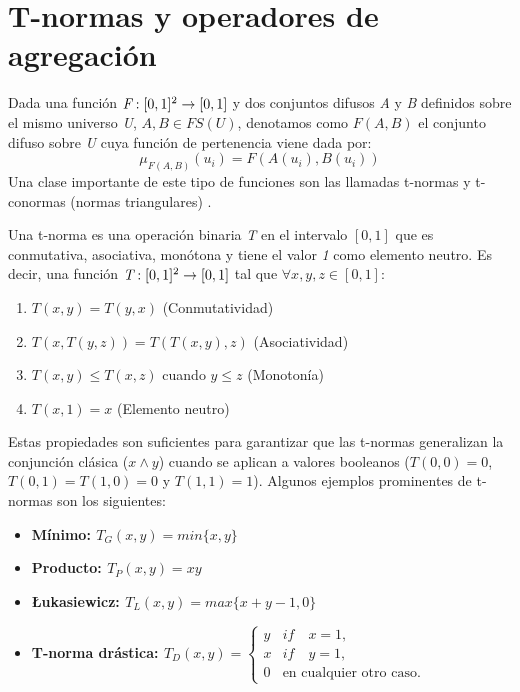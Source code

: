 \section{T-normas y operadores de agregación}\label{sec:t-norms-aggregation-operator}
Dada una función \begin{math}\emph{F}:[0,1]^2\rightarrow[0,1]\end{math} y dos conjuntos difusos \emph{A} y \emph{B} definidos sobre el mismo universo \emph{U}, \begin{math}A,B\in FS(U)\end{math}, denotamos como \begin{math}F(A,B)\end{math} el conjunto difuso sobre \emph{U} cuya función de pertenencia viene dada por:
\begin{equation}
\mu_{F(A,B)}(u_{i}) = F(A(u_{i}),B(u_{i}))
\end{equation}
Una clase importante de este tipo de funciones son las llamadas t-normas y t-conormas (normas triangulares) \cite{klement2000triangular}.
\begin{definition}\label{def:tnorma}
Una t-norma es una operación binaria \emph{T} en el intervalo $[0,1]$ que es conmutativa, asociativa, monótona y tiene el valor \emph{1} como elemento neutro. Es decir, una función $\emph{T} : [0,1]^2 \rightarrow [0,1]$ tal que $\forall x,y,z \in [0,1]$:
\begin{enumerate}[label=(T\arabic*),ref=(T\arabic*)]
   \item $T(x,y) = T(y,x)$ (Conmutatividad)\label{T1}
   \item $T(x,T(y,z)) = T(T(x,y),z)$ (Asociatividad)\label{T2}
   \item $T(x,y) \leq T(x,z)$ cuando $y \leq z$ (Monotonía)\label{T3}
   \item $T(x,1) = x$ (Elemento neutro)\label{T4}
  \end{enumerate}
\end{definition}
Estas propiedades son suficientes para garantizar que las t-normas generalizan la conjunción clásica ($x\wedge y$) cuando se aplican a valores booleanos ($T(0,0)=0$,$T(0,1)=T(1,0)=0$ y $T(1,1)=1$).
Algunos ejemplos prominentes de t-normas son los siguientes:
\begin{itemize}
	\item \bfseries Mínimo: $T_{G}(x,y) = min\{x,y\}$
	\item \bfseries Producto: $T_{P}(x,y) = xy$
	\item \bfseries \L{}ukasiewicz: $T_{L}(x,y) = max\{x+y-1,0\}$
	\item \bfseries T-norma drástica: \mdseries $T_{D}(x,y) = \begin{cases} y & if\quad x=1, \\ x & if\quad y=1, \\0 & \text{en cualquier otro caso}. \end{cases}$
\end{itemize}
